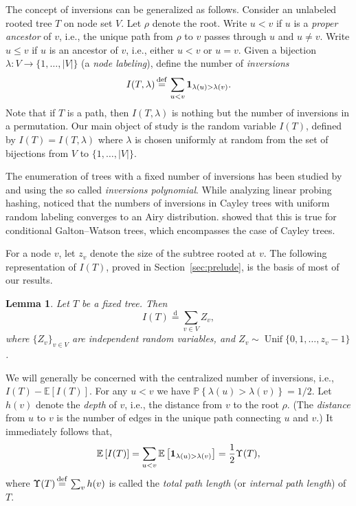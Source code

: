 \documentclass[11pt]{article}
\newcommand{\E}[1]{\mathbb{E} \left[#1\right]}
\newcommand{\ind}{{\bf 1}}
\def\U{\Upsilon}
\def\l{\lambda}
\def\r{\rho}
\newcommand\Prob[1]{{\mathbb{P}\left\{#1\right\}}}
\numberwithin{theorem}{section}
\newtheorem{lemma}[theorem]{Lemma}
\theoremstyle{definition}
\newcommand{\eqd}{\,{\buildrel {\mathrm{def}} \over =}\,}
\newcommand{\Unif}{\mathop{\mathrm{Unif}}}
\numberwithin{equation}{section}
\newcommand{\refS}[1]{Section~\ref{#1}}
\newcommand\eqdd{\overset{\mathrm{d}}{=}}
\begin{document}
The concept of inversions can be generalized as follows.
Consider an unlabeled rooted tree $T$ on node set $V$. Let $\r$ denote the root. Write $u < v$
if $u$ is a \emph{proper ancestor} of $v$, i.e., the unique path from $\r$ to $v$ passes through $u$
and \(u \ne v\). Write
$u \le v$ if \(u\) is an ancestor of \(v\), i.e., either $u < v$ or $u = v$. Given a bijection $\l : V \to \{1,\dots,|V|\}$ (a {\em
    node labeling}), define the number of {\em inversions}
$$
I(T, \l) \eqd \sum_{u < v} {\ind}_{\l(u) > \l(v)}.
$$
Note that if \(T\) is a path, then \(I(T, \l)\) is nothing but the number of inversions in a
permutation. Our main object of study is the random variable $I(T)$, defined
by $I(T) = I(T, \l)$ where $\l$ is chosen uniformly at 
random from the set of bijections from $V$ to $\{1,\dots,|V|\}$.

The enumeration of trees with a fixed number of inversions has been studied by \citet{mr68} and
\citet{gsy95} using the so called \emph{inversions polynomial}.  While analyzing linear probing
hashing, \citet{fpv98} noticed that the numbers of inversions in Cayley
trees with uniform
random labeling converges to an Airy distribution.  \citet{ps12} showed that this is true for
conditional Galton--Watson trees, which encompasses the case of Cayley trees.

 
For a node \(v\), let $z_v$ denote the size of the subtree rooted at $v$. 
The following representation of \(I(T)\), proved in \refS{sec:prelude}, is the basis of most of our results.
\begin{lemma}\label{lem:independence}
    Let \(T\) be a fixed tree. Then
    \begin{equation}\label{it}
        I(T) \eqdd \sum_{v\in V} Z_v,
    \end{equation}
    where $\{Z_v\}_{v\in V}$ are independent random variables, and 
    $Z_v \sim \Unif\{0,1,\dots,z_v-1\}$.
\end{lemma}

We will generally be concerned with the centralized number of inversions, i.e., $I(T) - \E{I(T)}$.
For any $u < v$ we have $\Prob{\l(u) > \l(v)} = 1/2$.
Let \(h(v)\) denote the \emph{depth} of \(v\), i.e., the distance from \(v\) to the root \(\rho\).
(The \emph{distance} from \(u\) to \(v\) is the number of edges in the unique path connecting
\(u\) and \(v\).)
It immediately follows that,
\begin{equation}\label{eq:halftpl}
\E{I(T)} = \sum_{u < v} \E{{\ind}_{\l(u) > \l(v)}} = \frac12 \U(T)
,
\end{equation}
where $\U(T) \eqd \sum_{v} h(v)$ is called the {\em total path length} (or {\em internal path
    length}) of $T$.
\end{document}
